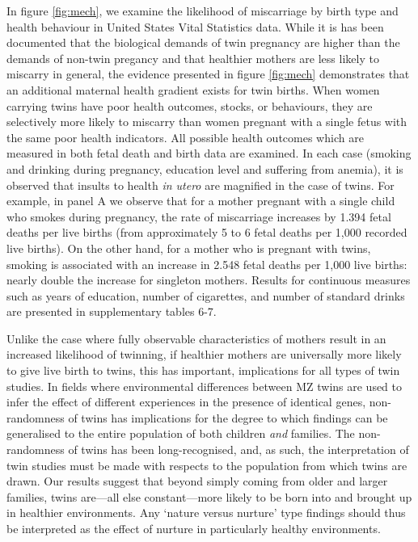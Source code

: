 \documentclass{nature}
\begin{document}
\begin{linenumbers}
In figure \ref{fig:mech}, we examine the likelihood of miscarriage by birth type and health behaviour in United States Vital Statistics data.  While it is has been documented that the biological demands of twin pregnancy are higher than the demands of non-twin pregancy\cite{Shinagawaetal2005,Kahnetal2003} and that healthier mothers are less likely to miscarry in general\cite{Frettsetal1995,Garciaetal2002}, the evidence presented in figure \ref{fig:mech} demonstrates that an additional maternal health gradient exists for twin births. When women carrying twins have poor health outcomes, stocks, or behaviours, they are selectively more likely to miscarry than women pregnant with a single fetus with the same poor health indicators.  All possible health outcomes which are measured in both fetal death and birth data are examined.  In each case (smoking and drinking during pregnancy, education level and suffering from anemia), it is observed that insults to health \emph{in utero} are magnified in the case of twins.  For example, in panel A we observe that for a mother pregnant with a single child who smokes during pregnancy, the rate of miscarriage increases by 1.394 fetal deaths per live births (from approximately 5 to 6 fetal deaths per 1,000 recorded live births).  On the other hand, for a mother who is pregnant with twins, smoking is associated with an increase in 2.548 fetal deaths per 1,000 live births: nearly double the increase for singleton mothers.  Results for continuous measures such as years of education, number of cigarettes, and number of standard drinks are presented in supplementary tables 6-7.  

Unlike the case where fully observable characteristics of mothers result in an increased likelihood of twinning, if healthier mothers are universally more likely to give live birth to twins, this has important, implications for all types of twin studies.  In fields where environmental differences between MZ twins are used to infer the effect of different experiences in the presence of identical genes, non-randomness of twins has implications for the degree to which findings can be generalised to the entire population of both children \emph{and} families.  The non-randomness of twins has been long-recognised\cite{Recordetal1970}, and, as such, the interpretation of twin studies must be made with respects to the population from which twins are drawn.  Our results suggest that beyond simply coming from older and larger families, twins are---all else constant---more likely to be born into and brought up in healthier environments.  Any `nature versus nurture' type findings should thus be interpreted as the effect of nurture in particularly healthy environments.


\end{linenumbers}
\end{document}
